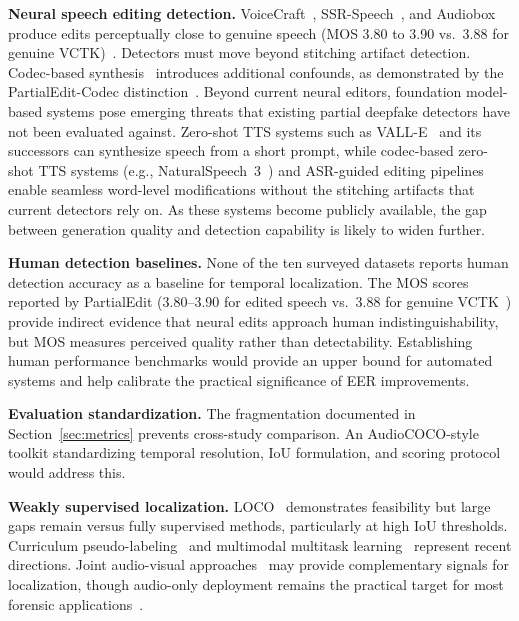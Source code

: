 \documentclass[journal]{IEEEtran}
\begin{document}
\textbf{Neural speech editing detection.} VoiceCraft~\cite{peng2024voicecraft}, SSR-Speech~\cite{wang2025ssrspeech}, and Audiobox~\cite{vyas2023audiobox} produce edits perceptually close to genuine speech (MOS 3.80 to 3.90 vs.\ 3.88 for genuine VCTK)~\cite{zhang2025partialedit,kassmann2024speechediting}. Detectors must move beyond stitching artifact detection. Codec-based synthesis~\cite{defossez2023encodec,zeghidour2022soundstream,codecfake2024,xie2025codecfake_dataset} introduces additional confounds, as demonstrated by the PartialEdit-Codec distinction~\cite{zhang2025partialedit}. Beyond current neural editors, foundation model-based systems pose emerging threats that existing partial deepfake detectors have not been evaluated against. Zero-shot TTS systems such as VALL-E~\cite{wang2023valle} and its successors can synthesize speech from a short prompt, while codec-based zero-shot TTS systems (e.g., NaturalSpeech~3~\cite{ju2024naturalspeech3}) and ASR-guided editing pipelines enable seamless word-level modifications without the stitching artifacts that current detectors rely on. As these systems become publicly available, the gap between generation quality and detection capability is likely to widen further.

\textbf{Human detection baselines.} None of the ten surveyed datasets reports human detection accuracy as a baseline for temporal localization. The MOS scores reported by PartialEdit (3.80--3.90 for edited speech vs.\ 3.88 for genuine VCTK~\cite{zhang2025partialedit}) provide indirect evidence that neural edits approach human indistinguishability, but MOS measures perceived quality rather than detectability. Establishing human performance benchmarks would provide an upper bound for automated systems and help calibrate the practical significance of EER improvements.

\textbf{Evaluation standardization.} The fragmentation documented in Section~\ref{sec:metrics} prevents cross-study comparison. An AudioCOCO-style toolkit standardizing temporal resolution, IoU formulation, and scoring protocol would address this.

\textbf{Weakly supervised localization.} LOCO~\cite{wu2025loco} demonstrates feasibility but large gaps remain versus fully supervised methods, particularly at high IoU thresholds. Curriculum pseudo-labeling~\cite{zhang2025cpl} and multimodal multitask learning~\cite{xu2025wmmt} represent recent directions. Joint audio-visual approaches~\cite{zhou2021joint,cheng2024avforgery} may provide complementary signals for localization, though audio-only deployment remains the practical target for most forensic applications~\cite{ji2024speechforensics}.
\end{document}
